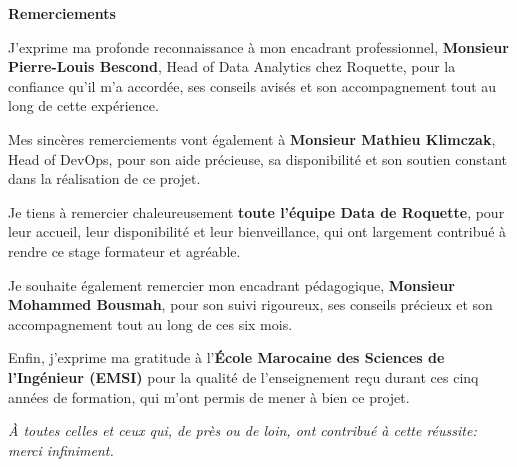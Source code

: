 \documentclass[12pt,a4paper]{report}
\begin{document}
\clearpage

\cleardoublepage
{} %
\setcounter{page}{1}
\vspace*{1.5cm}

\begin{center}
    {\Large\bfseries Remerciements}\par
    \vspace{1.2cm}

    \begin{minipage}{0.85\linewidth}
    \centering
    J’exprime ma profonde reconnaissance à mon encadrant professionnel, \textbf{Monsieur Pierre-Louis Bescond}, Head of Data Analytics chez Roquette, pour la confiance qu’il m’a accordée, ses conseils avisés et son accompagnement tout au long de cette expérience.\par
    \vspace{0.8em}

    Mes sincères remerciements vont également à \textbf{Monsieur Mathieu Klimczak}, Head of DevOps, pour son aide précieuse, sa disponibilité et son soutien constant dans la réalisation de ce projet.\par
    \vspace{0.8em}

    Je tiens à remercier chaleureusement \textbf{toute l’équipe Data de Roquette}, pour leur accueil, leur disponibilité et leur bienveillance, qui ont largement contribué à rendre ce stage formateur et agréable.\par
    \vspace{0.8em}

    Je souhaite également remercier mon encadrant pédagogique, \textbf{Monsieur Mohammed Bousmah}, pour son suivi rigoureux, ses conseils précieux et son accompagnement tout au long de ces six mois.\par
    \vspace{0.8em}

    Enfin, j’exprime ma gratitude à l’\textbf{École Marocaine des Sciences de l’Ingénieur (EMSI)} pour la qualité de l’enseignement reçu durant ces cinq années de formation, qui m’ont permis de mener à bien ce projet.\par

    \vspace{1.2em}
    \emph{À toutes celles et ceux qui, de près ou de loin, ont contribué à cette réussite: merci infiniment.}
    \end{minipage}
\end{center}
\clearpage
\end{document}
